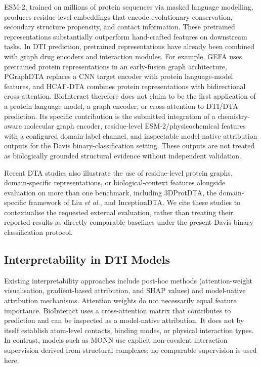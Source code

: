 \documentclass[fleqn,10pt]{wlscirep}
\begin{document}
ESM-2,\cite{lin2023evolutionary} trained on millions of protein sequences
via masked language modelling, produces residue-level embeddings that encode
evolutionary conservation, secondary structure propensity, and contact
information.  These pretrained representations substantially outperform
hand-crafted features on downstream tasks.\cite{rives2021biological}  In DTI
\begingroup\color{red}
prediction, pretrained representations have already been combined with graph
drug encoders and interaction modules.  For example, GEFA uses pretrained
protein representations in an early-fusion graph architecture,\cite{nguyen2022gefa}
PGraphDTA replaces a CNN target encoder with protein language-model features,
\cite{bal2023pgraphdta} and HCAF-DTA combines protein representations with
bidirectional cross-attention.\cite{li2025hcafdta}  BioInteract therefore does
not claim to be the first application of a protein language model, a graph
encoder, or cross-attention to DTI/DTA prediction.  Its specific contribution is
the submitted integration of a chemistry-aware molecular graph encoder,
residue-level ESM-2/physicochemical features with a configured domain-label
channel, and inspectable model-native attribution
outputs for the Davis binary-classification setting.  These outputs are not
treated as biologically grounded structural evidence without independent
validation.

Recent DTA studies also illustrate the use of residue-level protein graphs,
domain-specific representations, or biological-context features alongside
evaluation on more than one benchmark, including 3DProtDTA,\cite{voitsitskyi2023_3dprotdta}
the domain-specific framework of Liu \textit{et al.},\cite{liu2024domainspecific}
and InceptionDTA.\cite{kalemati2025inceptiondta}  We cite these studies to
contextualise the requested external evaluation, rather than treating their
reported results as directly comparable baselines under the present Davis binary
classification protocol.
\endgroup

\subsection{Interpretability in DTI Models}

Existing interpretability approaches include post-hoc methods (attention-weight
visualisation, gradient-based attribution, and SHAP values\cite{jimenez2020drug})
and model-native attribution mechanisms.  Attention weights do not necessarily
equal feature importance.\cite{jain2019attention}  BioInteract uses a
cross-attention matrix that contributes to prediction and can be inspected as a
model-native attribution.  It does not by itself establish atom-level contacts,
binding modes, or physical interaction types.  \begingroup\color{red}In contrast,
models such as MONN use explicit non-covalent interaction supervision derived
from structural complexes;\cite{li2020monn} no comparable supervision is used
here.\endgroup
\end{document}
